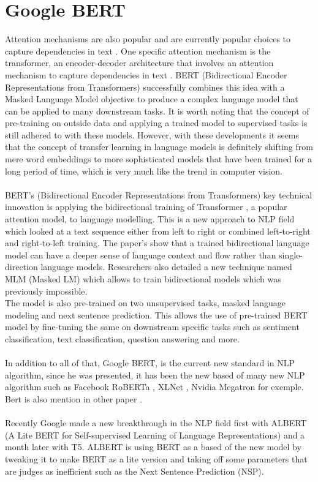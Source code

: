 \section{Google BERT}
Attention mechanisms are also popular and are currently popular choices to capture dependencies in text \cite{Lin2017, Openai}. One specific attention mechanism is the transformer, an encoder-decoder architecture that involves an attention mechanism to capture dependencies in text \cite{Vaswani2017}. BERT (Bidirectional Encoder Representations from Transformers) \cite{Devlin2018} successfully combines this idea with a Masked Language Model objective to produce a complex language model that can be applied to many downstream tasks. It is worth noting that the concept of pre-training on outside data and applying a trained model to supervised tasks is still adhered to with these models. However, with these developments it seems that the concept of transfer learning in language models is definitely shifting from mere word embeddings to more sophisticated models that have been trained for a long period of time, which is very much like the trend in computer vision.\\
\\
BERT’s \cite{Devlin2018} (Bidirectional Encoder Representations from Transformers) key technical innovation is applying the bidirectional training of Transformer \cite{Vaswani2017}, a popular attention model, to language modelling. This is a new approach to NLP field which looked at a text sequence either from left to right or combined left-to-right and right-to-left training. The paper’s show that a trained bidirectional language model can have a deeper sense of language context and flow rather than single-direction language models. Researchers also detailed a new technique named MLM (Masked LM) which allows to train bidirectional models which was previously impossible. \\
The model is also pre-trained on two unsupervised tasks, masked language modeling and next sentence prediction. This allows the use of pre-trained BERT model by fine-tuning the same on downstream specific tasks such as sentiment classification, text classification, question answering and more.\\
\\
In addition to all of that, Google BERT, is the current new standard in NLP algorithm, since he was presented, it has been the new based of many new NLP algorithm such as Facebook RoBERTa \cite{Liu2019d}, XLNet \cite{Yang2019}, Nvidia Megatron \cite{Shoeybi} for exemple. Bert is also mention in other paper \cite{Zhu2019, Wang2019c}. \\ 
\\
Recently Google made a new breakthrough in the NLP field first with ALBERT (A Lite BERT for Self-supervised Learning of Language Representations) \cite{Lan} and a month later with T5\cite{Raffel2019}. ALBERT is using BERT as a based of the new model by tweaking it to make BERT as a lite version and taking off some parameters that are judges as inefficient such as the Next Sentence Prediction (NSP).

